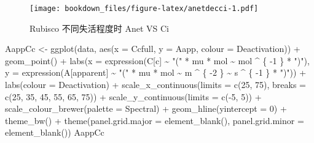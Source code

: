 \documentclass[
]{krantz}
\makeatletter
\newenvironment{Shaded}{\begin{snugshade}}{\end{snugshade}}
\newcommand{\AttributeTok}[1]{\textcolor[rgb]{0.77,0.63,0.00}{#1}}
\newcommand{\DecValTok}[1]{\textcolor[rgb]{0.00,0.00,0.81}{#1}}
\newcommand{\FunctionTok}[1]{\textcolor[rgb]{0.00,0.00,0.00}{#1}}
\newcommand{\NormalTok}[1]{#1}
\newcommand{\OtherTok}[1]{\textcolor[rgb]{0.56,0.35,0.01}{#1}}
\newcommand{\SpecialCharTok}[1]{\textcolor[rgb]{0.00,0.00,0.00}{#1}}
\newcommand{\StringTok}[1]{\textcolor[rgb]{0.31,0.60,0.02}{#1}}
\newenvironment{kframe}{%
\medskip{}
\setlength{\fboxsep}{.8em}
 \def\at@end@of@kframe{}%
 \ifinner\ifhmode%
  \def\at@end@of@kframe{\end{minipage}}%
  \begin{minipage}{\columnwidth}%
 \fi\fi%
 \def\FrameCommand##1{\hskip\@totalleftmargin \hskip-\fboxsep
 \colorbox{shadecolor}{##1}\hskip-\fboxsep
     \hskip-\linewidth \hskip-\@totalleftmargin \hskip\columnwidth}%
 \MakeFramed {\advance\hsize-\width
   \@totalleftmargin\z@ \linewidth\hsize
   \@setminipage}}%
 {\par\unskip\endMakeFramed%
 \at@end@of@kframe}
\renewenvironment{Shaded}{\begin{kframe}}{\end{kframe}}
\makeatother
\begin{document}
\begin{figure}
\centering
\texttt{[image: bookdown\_files/figure-latex/anetdecci-1.pdf]}
\caption{\label{fig:anetdecci}Rubisco 不同失活程度时 Anet VS Ci}
\end{figure}

\begin{Shaded}
\begin{Highlighting}[]
\NormalTok{AappCc }\OtherTok{\textless{}{-}}
  \FunctionTok{ggplot}\NormalTok{(data, }\FunctionTok{aes}\NormalTok{(}\AttributeTok{x =}\NormalTok{ Ccfull, }\AttributeTok{y =}\NormalTok{ Aapp, }\AttributeTok{colour =}\NormalTok{ Deactivation)) }\SpecialCharTok{+}
  \FunctionTok{geom\_point}\NormalTok{() }\SpecialCharTok{+}
  \FunctionTok{labs}\NormalTok{(}\AttributeTok{x =} \FunctionTok{expression}\NormalTok{(C[c] }\SpecialCharTok{\textasciitilde{}} \StringTok{"("} \SpecialCharTok{*}\NormalTok{ mu }\SpecialCharTok{*}\NormalTok{ mol }\SpecialCharTok{\textasciitilde{}}\NormalTok{ mol }\SpecialCharTok{\^{}}\NormalTok{ \{}
    \SpecialCharTok{{-}}\DecValTok{1}
\NormalTok{  \} }\SpecialCharTok{*} \StringTok{")"}\NormalTok{),}
  \AttributeTok{y =} \FunctionTok{expression}\NormalTok{(A[apparent] }\SpecialCharTok{\textasciitilde{}} \StringTok{"("} \SpecialCharTok{*}\NormalTok{ mu }\SpecialCharTok{*}\NormalTok{ mol }\SpecialCharTok{\textasciitilde{}}\NormalTok{ m }\SpecialCharTok{\^{}}\NormalTok{ \{}
    \SpecialCharTok{{-}}\DecValTok{2}
\NormalTok{  \} }\SpecialCharTok{\textasciitilde{}}\NormalTok{ s }\SpecialCharTok{\^{}}\NormalTok{ \{}
    \SpecialCharTok{{-}}\DecValTok{1}
\NormalTok{  \} }\SpecialCharTok{*} \StringTok{")"}\NormalTok{)) }\SpecialCharTok{+}
  \FunctionTok{labs}\NormalTok{(}\AttributeTok{colour =} \StringTok{\textquotesingle{}Deactivation\textquotesingle{}}\NormalTok{) }\SpecialCharTok{+}
  \FunctionTok{scale\_x\_continuous}\NormalTok{(}\AttributeTok{limits =} \FunctionTok{c}\NormalTok{(}\DecValTok{25}\NormalTok{, }\DecValTok{75}\NormalTok{),}
                     \AttributeTok{breaks =} \FunctionTok{c}\NormalTok{(}\DecValTok{25}\NormalTok{, }\DecValTok{35}\NormalTok{, }\DecValTok{45}\NormalTok{, }\DecValTok{55}\NormalTok{, }\DecValTok{65}\NormalTok{, }\DecValTok{75}\NormalTok{)) }\SpecialCharTok{+}
  \FunctionTok{scale\_y\_continuous}\NormalTok{(}\AttributeTok{limits =} \FunctionTok{c}\NormalTok{(}\SpecialCharTok{{-}}\DecValTok{5}\NormalTok{, }\DecValTok{5}\NormalTok{)) }\SpecialCharTok{+}
  \FunctionTok{scale\_colour\_brewer}\NormalTok{(}\AttributeTok{palette =} \StringTok{\textquotesingle{}Spectral\textquotesingle{}}\NormalTok{) }\SpecialCharTok{+}
  \FunctionTok{geom\_hline}\NormalTok{(}\AttributeTok{yintercept =} \DecValTok{0}\NormalTok{) }\SpecialCharTok{+}
  \FunctionTok{theme\_bw}\NormalTok{() }\SpecialCharTok{+}
  \FunctionTok{theme}\NormalTok{(}\AttributeTok{panel.grid.major =} \FunctionTok{element\_blank}\NormalTok{(),}
        \AttributeTok{panel.grid.minor =} \FunctionTok{element\_blank}\NormalTok{())}
\NormalTok{AappCc}
\end{Highlighting}
\end{Shaded}
\end{document}
